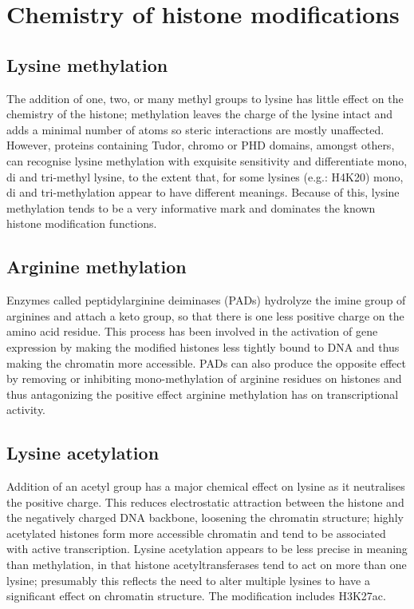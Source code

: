 \hypertarget{chemistry-of-histone-modifications}{%
\section{Chemistry of histone modifications}\label{chemistry-of-histone-modifications}}

\hypertarget{lysine-methylation}{%
\subsection{Lysine methylation}\label{lysine-methylation}}

The addition of one, two, or many methyl groups to lysine has little effect on the chemistry of the histone; methylation leaves the charge of the lysine intact and adds a minimal number of atoms so steric interactions are mostly unaffected. However, proteins containing Tudor, chromo or PHD domains, amongst others, can recognise lysine methylation with exquisite sensitivity and differentiate mono, di and tri-methyl lysine, to the extent that, for some lysines (e.g.: H4K20) mono, di and tri-methylation appear to have different meanings. Because of this, lysine methylation tends to be a very informative mark and dominates the known histone modification functions.

\hypertarget{arginine-methylation}{%
\subsection{Arginine methylation}\label{arginine-methylation}}

Enzymes called peptidylarginine deiminases (PADs) hydrolyze the imine group of arginines and attach a keto group, so that there is one less positive charge on the amino acid residue. This process has been involved in the activation of gene expression by making the modified histones less tightly bound to DNA and thus making the chromatin more accessible. PADs can also produce the opposite effect by removing or inhibiting mono-methylation of arginine residues on histones and thus antagonizing the positive effect arginine methylation has on transcriptional activity.

\hypertarget{lysine-acetylation}{%
\subsection{Lysine acetylation}\label{lysine-acetylation}}

Addition of an acetyl group has a major chemical effect on lysine as it neutralises the positive charge. This reduces electrostatic attraction between the histone and the negatively charged DNA backbone, loosening the chromatin structure; highly acetylated histones form more accessible chromatin and tend to be associated with active transcription. Lysine acetylation appears to be less precise in meaning than methylation, in that histone acetyltransferases tend to act on more than one lysine; presumably this reflects the need to alter multiple lysines to have a significant effect on chromatin structure. The modification includes H3K27ac.

